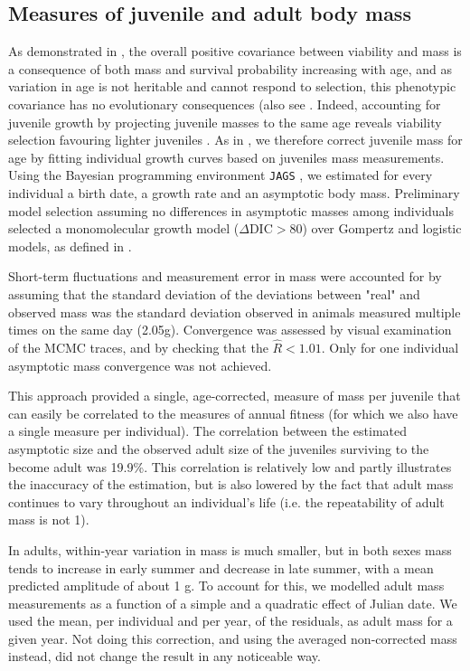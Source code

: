 \subsection*{Measures of juvenile and adult body mass}
As demonstrated in \cite{Bonnet2016}, the overall positive covariance between viability and mass is a consequence of both mass and survival probability increasing with age, and as variation in age is not heritable and cannot respond to selection, this phenotypic covariance has no evolutionary consequences (also see \parencite{VanNoordwijk1988a, Rausher1992}. Indeed, accounting for juvenile growth by projecting juvenile masses to the same age reveals viability selection favouring lighter juveniles \parencite{Bonnet2016}. As in \parencite{Bonnet2016}, we therefore correct juvenile mass for age by fitting individual growth curves based on juveniles mass measurements. Using the Bayesian programming environment \texttt{JAGS} \cite{Plummer2003}, we estimated for every individual a birth date, a growth rate and an asymptotic body mass. Preliminary model selection assuming no differences in asymptotic masses among individuals selected a monomolecular growth model ($\Delta \mathrm{DIC} > 80$) over Gompertz and logistic models, as defined in \cite{English2012}.

Short-term fluctuations and measurement error in mass were accounted for by assuming that the standard deviation of the deviations between "real" and observed mass was the standard deviation observed in animals measured multiple times on the same day (2.05g).
Convergence was assessed by visual examination of the MCMC traces, and by checking that the $\hat{R}<1.01$. Only for one individual asymptotic mass convergence was not achieved.

This approach provided a single, age-corrected, measure of mass per juvenile that can easily be correlated to the measures of annual fitness (for which we also have a single measure per individual).
The correlation between the estimated asymptotic size and the observed adult size of the juveniles surviving to the become adult was 19.9\%. This correlation is relatively low and partly illustrates the inaccuracy of the estimation, but is also lowered by the fact that adult mass continues to vary throughout an individual's life (i.e. the repeatability of adult mass is not 1).

In adults, within-year variation in mass is much smaller, but in both sexes mass tends to increase in early summer and decrease in late summer, with a mean predicted amplitude of about 1 g. To account for this, we modelled adult mass measurements as a function of a simple and a quadratic effect of Julian date. We used the mean, per individual and per year, of the residuals, as adult mass for a given year. Not doing this correction, and using the averaged non-corrected mass instead, did not change the result in any noticeable way.

